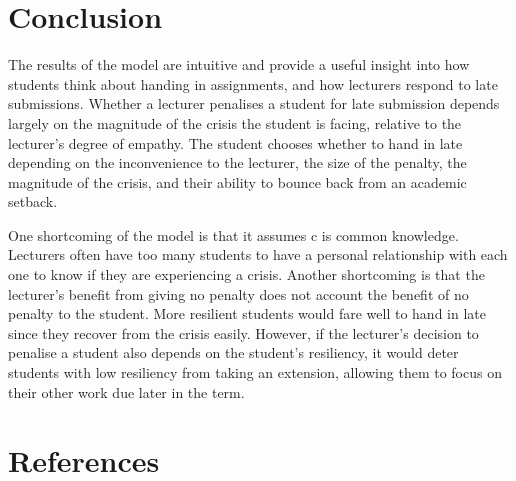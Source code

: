 \documentclass[11pt,preprint, authoryear]{elsarticle}
\numberwithin{equation}{section}
\numberwithin{figure}{section}
\numberwithin{table}{section}
\begin{document}
\hypertarget{conclusion}{%
\section{\texorpdfstring{Conclusion
\label{con}}{Conclusion }}\label{conclusion}}

The results of the model are intuitive and provide a useful insight into
how students think about handing in assignments, and how lecturers
respond to late submissions. Whether a lecturer penalises a student for
late submission depends largely on the magnitude of the crisis the
student is facing, relative to the lecturer's degree of empathy. The
student chooses whether to hand in late depending on the inconvenience
to the lecturer, the size of the penalty, the magnitude of the crisis,
and their ability to bounce back from an academic setback.

One shortcoming of the model is that it assumes c is common knowledge.
Lecturers often have too many students to have a personal relationship
with each one to know if they are experiencing a crisis. Another
shortcoming is that the lecturer's benefit from giving no penalty does
not account the benefit of no penalty to the student. More resilient
students would fare well to hand in late since they recover from the
crisis easily. However, if the lecturer's decision to penalise a student
also depends on the student's resiliency, it would deter students with
low resiliency from taking an extension, allowing them to focus on their
other work due later in the term.

\newpage

\hypertarget{references}{%
\section*{References}\label{references}}
\end{document}
